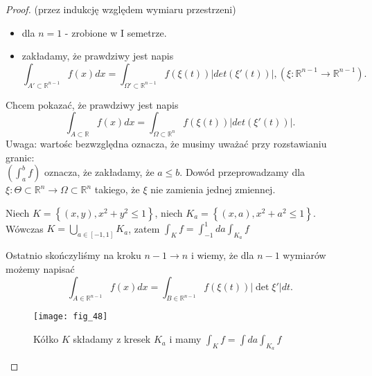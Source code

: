 \documentclass[../main.tex]{subfiles}
\begin{document}
    \begin{proof}
        (przez indukcję względem wymiaru przestrzeni)\\
        \begin{itemize}
            \item dla $n=1$ - zrobione w I semetrze.
            \item zakładamy, że prawdziwy jest napis
                \[
                    \int_{A'\subset\mathbb{R}^{n-1}} f(x)dx = \int_{\Omega' \subset\mathbb{R}^{n-1}} f(\xi(t)) | det(\xi'(t)) |, (\xi: \mathbb{R}^{n-1}\to \mathbb{R}^{n-1})
                .\]
        \end{itemize}
        Chcem pokazać, że prawdziwy jest napis
        \[
            \int_{A\subset\mathbb{R}} f(x) dx = \int_{\Omega \subset \mathbb{R}^n} f(\xi(t)) | det(\xi'(t)) |
        .\]
        Uwaga: wartośc bezwzględna oznacza, że musimy uważać przy rozstawianiu granic:\\
        $\left( \int_a^b f \right) $ oznacza, że zakładamy, że $a\le b$. Dowód przeprowadzamy dla $\xi: \Theta\subset\mathbb{R}^n\to \Omega\subset\mathbb{R}^n$ takiego, że $\xi$ nie zamienia jednej zmiennej.
        \begin{obserwacja}
            Niech $K = \left\{ (x,y), x^2+y^2 \le 1 \right\} $, niech $K_a = \left\{ (x,a), x^2+a^2 \le 1 \right\}.$\\
            Wówczas $K = \bigcup_{a\in[-1,1]}K_a$, zatem $\int_K f = \int_{-1}^1 da \int _{K_a} f$

        \end{obserwacja}
    Ostatnio skończyliśmy na kroku $n-1\to n$ i wiemy, że dla $n-1$ wymiarów możemy napisać
    \[
        \int_{A\in \mathbb{R}^{n-1}}f(x)dx = \int_{B\in \mathbb{R}^{n-1}}f(\xi(t)) |\det \xi'|dt
        .\]
    \begin{figure}[h]
        \centering
        \texttt{[image: fig\_48]}
        \caption{Kółko $K$ składamy z kresek $K_a$ i mamy $\int_K f = \int da \int_{K_a} f$}
        \label{fig:fig_48}
    \end{figure}


\end{proof}
\end{document}

